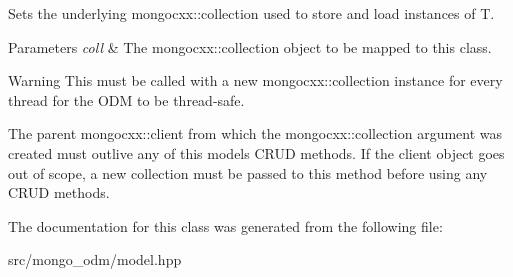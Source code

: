 Sets the underlying mongocxx\+::collection used to store and load instances of T. 


\begin{DoxyParams}{Parameters}
{\em coll} & The mongocxx\+::collection object to be mapped to this class.\\
\hline
\end{DoxyParams}
\begin{DoxyWarning}{Warning}
This must be called with a new mongocxx\+::collection instance for every thread for the O\+DM to be thread-\/safe.

The parent mongocxx\+::client from which the mongocxx\+::collection argument was created must outlive any of this model\textquotesingle{}s C\+R\+UD methods. If the client object goes out of scope, a new collection must be passed to this method before using any C\+R\+UD methods. 
\end{DoxyWarning}


The documentation for this class was generated from the following file\+:\begin{DoxyCompactItemize}
\item 
src/mongo\+\_\+odm/model.\+hpp\end{DoxyCompactItemize}
